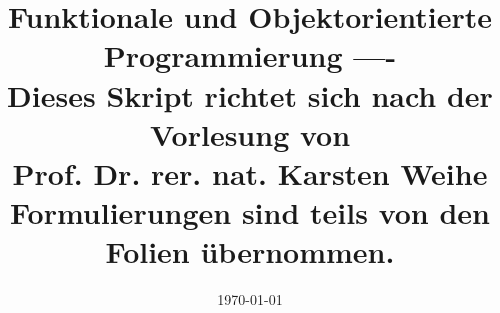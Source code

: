 \documentclass[a4paper,12pt,liststotoc, parskip=half]{scrreprt}
\begin{document}
    \pagestyle{fancy}

    \title{
      Funktionale und Objektorientierte Programmierung
      \large ---- \\ Dieses Skript richtet sich nach der Vorlesung von \\ Prof. Dr. rer. nat. Karsten Weihe \\ Formulierungen sind teils von den Folien übernommen.}
		\author{}
    \date{\today}
    \maketitle
    \pagestyle{fancy}
    \lhead{}
    \chead{\leftmark}
    \rhead{}

    \cfoot{\thepage}
    \rfoot{ %
    \date{\today} }

    \begingroup
      \renewcommand*{\chapterpagestyle}{empty}

      \pagestyle{empty}
      \tableofcontents
    \endgroup


    \clearpage

    
    
    
    
		
    \appendix

    
\end{document}
